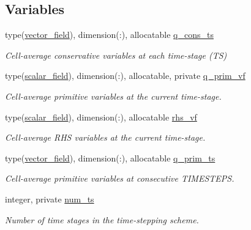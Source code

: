 \subsection*{Variables}
\begin{DoxyCompactItemize}
\item 
type(\hyperlink{structm__derived__types_1_1vector__field}{vector\+\_\+field}), dimension(\+:), allocatable \hyperlink{namespacem__time__steppers_a4bbe3aedc07e11e85679ec0c7a094f37}{q\+\_\+cons\+\_\+ts}
\begin{DoxyCompactList}\small\item\em Cell-\/average conservative variables at each time-\/stage (TS) \end{DoxyCompactList}\item 
type(\hyperlink{structm__derived__types_1_1scalar__field}{scalar\+\_\+field}), dimension(\+:), allocatable, private \hyperlink{namespacem__time__steppers_a10a568906592e51b56cf5dbfba0d9edb}{q\+\_\+prim\+\_\+vf}
\begin{DoxyCompactList}\small\item\em Cell-\/average primitive variables at the current time-\/stage. \end{DoxyCompactList}\item 
type(\hyperlink{structm__derived__types_1_1scalar__field}{scalar\+\_\+field}), dimension(\+:), allocatable \hyperlink{namespacem__time__steppers_a3d0867c3c2572c712d2aed6d677e6fc2}{rhs\+\_\+vf}
\begin{DoxyCompactList}\small\item\em Cell-\/average R\+HS variables at the current time-\/stage. \end{DoxyCompactList}\item 
type(\hyperlink{structm__derived__types_1_1vector__field}{vector\+\_\+field}), dimension(\+:), allocatable \hyperlink{namespacem__time__steppers_a5fbb5dbdd477579d17f067ec7900e659}{q\+\_\+prim\+\_\+ts}
\begin{DoxyCompactList}\small\item\em Cell-\/average primitive variables at consecutive T\+I\+M\+E\+S\+T\+E\+PS. \end{DoxyCompactList}\item 
integer, private \hyperlink{namespacem__time__steppers_af1bbf3b693b9d269249a93dca5069b56}{num\+\_\+ts}
\begin{DoxyCompactList}\small\item\em Number of time stages in the time-\/stepping scheme. \end{DoxyCompactList}\end{DoxyCompactItemize}


